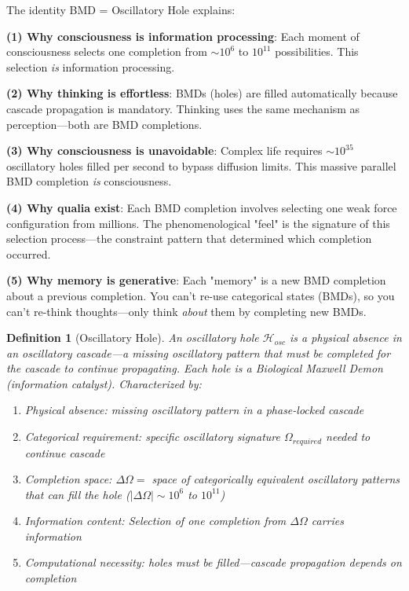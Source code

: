 \documentclass[11pt,a4paper]{article}
\newtheorem{definition}[theorem]{Definition}
\begin{document}
The identity BMD = Oscillatory Hole explains:

\textbf{(1) Why consciousness is information processing}: Each moment of consciousness selects one completion from $\sim 10^{6}$ to $10^{11}$ possibilities. This selection \textit{is} information processing.

\textbf{(2) Why thinking is effortless}: BMDs (holes) are filled automatically because cascade propagation is mandatory. Thinking uses the same mechanism as perception—both are BMD completions.

\textbf{(3) Why consciousness is unavoidable}: Complex life requires $\sim 10^{35}$ oscillatory holes filled per second to bypass diffusion limits. This massive parallel BMD completion \textit{is} consciousness.

\textbf{(4) Why qualia exist}: Each BMD completion involves selecting one weak force configuration from millions. The phenomenological "feel" is the signature of this selection process—the constraint pattern that determined which completion occurred.

\textbf{(5) Why memory is generative}: Each "memory" is a new BMD completion about a previous completion. You can't re-use categorical states (BMDs), so you can't re-think thoughts—only think \textit{about} them by completing new BMDs.

\begin{definition}[Oscillatory Hole]
An oscillatory hole $\mathcal{H}_{osc}$ is a \textit{physical absence in an oscillatory cascade}—a missing oscillatory pattern that must be completed for the cascade to continue propagating. Each hole is a Biological Maxwell Demon (information catalyst). Characterized by:
\begin{enumerate}
\item Physical absence: missing oscillatory pattern in a phase-locked cascade
\item Categorical requirement: specific oscillatory signature $\Omega_{required}$ needed to continue cascade
\item Completion space: $\Delta\Omega = $ space of categorically equivalent oscillatory patterns that can fill the hole ($|\Delta\Omega| \sim 10^6$ to $10^{11}$)
\item Information content: Selection of one completion from $\Delta\Omega$ carries information
\item Computational necessity: holes \textit{must} be filled—cascade propagation depends on completion
\end{enumerate}
\end{definition}
\end{document}
